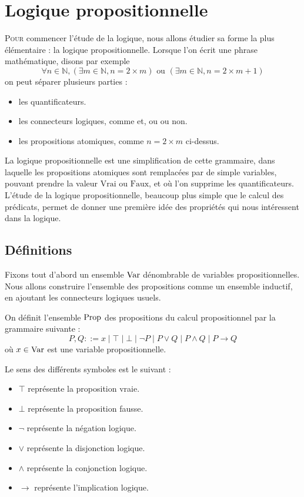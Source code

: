 \chapter{Logique propositionnelle}
\label{chp.logprop}

\minitoc

\lettrine{P}{our} commencer l'étude de la logique, nous allons étudier sa forme
la plus élémentaire : la logique propositionnelle. Lorsque l'on écrit une phrase
mathématique, disons par exemple
\[\forall n \in \mathbb N, (\exists m \in \mathbb N, n = 2\times m) \text{ ou }
(\exists m \in \mathbb N, n = 2 \times m + 1)\]
on peut séparer plusieurs parties :
\begin{itemize}
\item les quantificateurs.
\item les connecteurs logiques, comme \og et\fg{}, \og ou\fg{} ou \og non\fg{}.
\item les propositions atomiques, comme $n = 2 \times m$ ci-dessus.
\end{itemize}

La logique propositionnelle est une simplification de cette grammaire, dans
laquelle les propositions atomiques sont remplacées par de simple variables,
pouvant prendre la valeur $\mathrm{Vrai}$ ou $\mathrm{Faux}$, et où l'on
supprime les quantificateurs. L'étude de la logique propositionnelle, beaucoup
plus simple que le calcul des prédicats, permet de donner une première idée des
propriétés qui nous intéressent dans la logique.

\section{Définitions}

Fixons tout d'abord un ensemble $\operatorname{Var}$ dénombrable de variables
propositionnelles. Nous allons construire l'ensemble des propositions comme un
ensemble inductif, en ajoutant les connecteurs logiques usuels.

\begin{definition}[Propositions]
  On définit l'ensemble $\operatorname{Prop}$ des propositions du calcul
  propositionnel par la grammaire suivante :
  \[P,Q ::= x \mid \top \mid \bot \mid \lnot P \mid P \lor Q \mid P \land Q
  \mid P \to Q\]
  où $x\in \operatorname{Var}$ est une variable propositionnelle.
\end{definition}

Le sens des différents symboles est le suivant :
\begin{itemize}
\item $\top$ représente la proposition vraie.
\item $\bot$ représente la proposition fausse.
\item $\lnot$ représente la négation logique.
\item $\lor$ représente la disjonction logique.
\item $\land$ représente la conjonction logique.
\item $\to$ représente l'implication logique.
\end{itemize}

